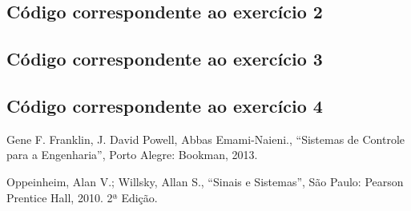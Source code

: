 \documentclass[a4paper,12pt,oneside,openany,table,xcdraw]{article}
\begin{document}

\vspace{0.3cm}



\vspace{0.3cm}
\subsection{Código correspondente ao exercício 2} \label{anexo:ex2}


\vspace{0.3cm}
\subsection{Código correspondente ao exercício 3} \label{anexo:ex3}


\vspace{0.3cm}
\subsection{Código correspondente ao exercício 4} \label{anexo:ex4}


\newpage
\begin{thebibliography}{9} 
    Gene F. Franklin, J. David Powell, Abbas Emami-Naieni.,
    “Sistemas de Controle para a Engenharia”, Porto Alegre: Bookman, 2013.

    Oppeinheim, Alan V.; Willsky, Allan S.,
    “Sinais e Sistemas”, São Paulo: Pearson
Prentice Hall, 2010. 2ª Edição.

\end{thebibliography}
\end{document}
